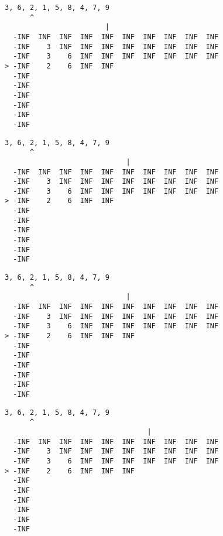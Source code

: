 { \begin{verbatim}
3, 6, 2, 1, 5, 8, 4, 7, 9
      ^
                        |
  -INF  INF  INF  INF  INF  INF  INF  INF  INF  INF
  -INF    3  INF  INF  INF  INF  INF  INF  INF  INF
  -INF    3    6  INF  INF  INF  INF  INF  INF  INF
> -INF    2    6  INF  INF                         
  -INF                                             
  -INF                                             
  -INF                                             
  -INF                                             
  -INF                                             
  -INF                                             
\end{verbatim} }

{ \begin{verbatim}
3, 6, 2, 1, 5, 8, 4, 7, 9
      ^
                             |
  -INF  INF  INF  INF  INF  INF  INF  INF  INF  INF
  -INF    3  INF  INF  INF  INF  INF  INF  INF  INF
  -INF    3    6  INF  INF  INF  INF  INF  INF  INF
> -INF    2    6  INF  INF                         
  -INF                                             
  -INF                                             
  -INF                                             
  -INF                                             
  -INF                                             
  -INF                                             
\end{verbatim} }

{ \begin{verbatim}
3, 6, 2, 1, 5, 8, 4, 7, 9
      ^
                             |
  -INF  INF  INF  INF  INF  INF  INF  INF  INF  INF
  -INF    3  INF  INF  INF  INF  INF  INF  INF  INF
  -INF    3    6  INF  INF  INF  INF  INF  INF  INF
> -INF    2    6  INF  INF  INF                    
  -INF                                             
  -INF                                             
  -INF                                             
  -INF                                             
  -INF                                             
  -INF                                             
\end{verbatim} }

{ \begin{verbatim}
3, 6, 2, 1, 5, 8, 4, 7, 9
      ^
                                  |
  -INF  INF  INF  INF  INF  INF  INF  INF  INF  INF
  -INF    3  INF  INF  INF  INF  INF  INF  INF  INF
  -INF    3    6  INF  INF  INF  INF  INF  INF  INF
> -INF    2    6  INF  INF  INF                    
  -INF                                             
  -INF                                             
  -INF                                             
  -INF                                             
  -INF                                             
  -INF                                             
\end{verbatim} }

